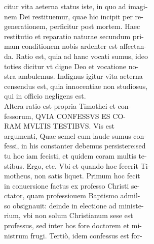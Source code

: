 \documentclass{article}
\begin{document}
\begin{pages}
                citur vita aeterna status iste, in quo ad imagi- \\
                nem Dei restituemur, quae hic incipit per re- \\
                generationem, perficitur post mortem. Haec \\
                restitutio et reparatio naturae secundum pri- \\
                mam conditionem nobis ardenter est affectan- \\
                da. Ratio est, quia ad hanc vocati sumus, ideo \\
                toties dicitur vt digne Deo et vocatione no- \\
                stra ambulemus. Indignus igitur vita aeterna \\
                censendus est, quia innocentiae non studiosus, \\
                qui in officio negligens est. \\
                Altera ratio est propria Timothei et con- \\
                fessorum, QVIA CONFESSVS ES CO- \\
                RAM MVLTIS TESTIBVS. Vis est \\
                argumenti, Quae semel cum laude sumus con- \\
                fessi, in his constanter debemus persistere:sed \\
                tu hoc iam fecisti, et quidem coram multis te- \\
                stibus. Ergo, etc. Vbi et quando hoc fecerit Ti- \\
                motheus, non satis liquet. Primum hoc fecit \\
                in conuersione factus ex professo Christi se- \\
                ctator, quam professiouem Baptismo admil- \\
                so obsignauit: deinde in electione ad ministe- \\
                rium, vbi non solum Christianum sese est \\
                professus, sed inter hos fore doctorem et mi- \\
                nistrum frugi. Tertiò, idem confessus est for- \\

\end{pages}
\end{document}
